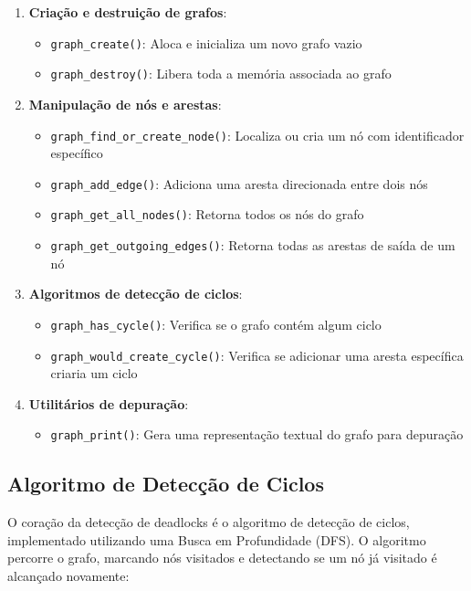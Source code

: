 \begin{enumerate}
    \item \textbf{Criação e destruição de grafos}:
    \begin{itemize}
        \item \texttt{graph\_create()}: Aloca e inicializa um novo grafo vazio
        \item \texttt{graph\_destroy()}: Libera toda a memória associada ao grafo
    \end{itemize}

    \item \textbf{Manipulação de nós e arestas}:
    \begin{itemize}
        \item \texttt{graph\_find\_or\_create\_node()}: Localiza ou cria um nó com identificador específico
        \item \texttt{graph\_add\_edge()}: Adiciona uma aresta direcionada entre dois nós
        \item \texttt{graph\_get\_all\_nodes()}: Retorna todos os nós do grafo
        \item \texttt{graph\_get\_outgoing\_edges()}: Retorna todas as arestas de saída de um nó
    \end{itemize}

    \item \textbf{Algoritmos de detecção de ciclos}:
    \begin{itemize}
        \item \texttt{graph\_has\_cycle()}: Verifica se o grafo contém algum ciclo
        \item \texttt{graph\_would\_create\_cycle()}: Verifica se adicionar uma aresta específica criaria um ciclo
    \end{itemize}

    \item \textbf{Utilitários de depuração}:
    \begin{itemize}
        \item \texttt{graph\_print()}: Gera uma representação textual do grafo para depuração
    \end{itemize}
\end{enumerate}

\subsection{Algoritmo de Detecção de Ciclos}

O coração da detecção de deadlocks é o algoritmo de detecção de ciclos, implementado utilizando uma Busca em Profundidade (DFS). O algoritmo percorre o grafo, marcando nós visitados e detectando se um nó já visitado é alcançado novamente:

